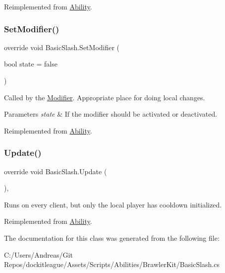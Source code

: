 Reimplemented from \hyperlink{class_ability_ad01c565b443fdca24556f1d7c054da3f}{Ability}.

\hypertarget{class_basic_slash_af42d098906ac33974f266ccc3b2aba6d}{}\label{class_basic_slash_af42d098906ac33974f266ccc3b2aba6d} 
\subsubsection{\texorpdfstring{Set\+Modifier()}{SetModifier()}}
{\footnotesize\ttfamily override void Basic\+Slash.\+Set\+Modifier (\begin{DoxyParamCaption}\item[{bool}]{state = {\ttfamily false} }\end{DoxyParamCaption})\hspace{0.3cm}{\ttfamily [virtual]}}



Called by the \hyperlink{class_modifier}{Modifier}. Appropriate place for doing local changes. 


\begin{DoxyParams}{Parameters}
{\em state} & If the modifier should be activated or deactivated.\\
\hline
\end{DoxyParams}


Reimplemented from \hyperlink{class_ability_a18f5361c45dc334b541892880382c098}{Ability}.

\hypertarget{class_basic_slash_a9bea8e187ba9a52f3a6ab0b48a218f60}{}\label{class_basic_slash_a9bea8e187ba9a52f3a6ab0b48a218f60} 
\subsubsection{\texorpdfstring{Update()}{Update()}}
{\footnotesize\ttfamily override void Basic\+Slash.\+Update (\begin{DoxyParamCaption}{ }\end{DoxyParamCaption})\hspace{0.3cm}{\ttfamily [protected]}, {\ttfamily [virtual]}}



Runs on every client, but only the local player has cooldown initialized. 



Reimplemented from \hyperlink{class_ability_a88d799f38be464be5f0a9a315efb2d0b}{Ability}.



The documentation for this class was generated from the following file\+:\begin{DoxyCompactItemize}
\item 
C\+:/\+Users/\+Andreas/\+Git Repos/dockitleague/\+Assets/\+Scripts/\+Abilities/\+Brawler\+Kit/Basic\+Slash.\+cs\end{DoxyCompactItemize}
